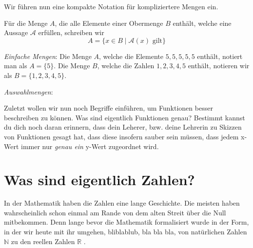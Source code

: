 Wir führen nun eine kompakte Notation für kompliziertere Mengen ein. 
\begin{definition}[Auswahl]
    Für die Menge \(A\), die alle Elemente einer Obermenge \(B\) enthält, welche eine Aussage \(\mathscr A\) erfüllen, schreiben wir 
    \begin{equation*}
        A = \{x \in B \mid \mathscr A(x) \text{ gilt}\}
    \end{equation*}
\end{definition}


\begin{definition}[Komplement]
    
\end{definition}

\begin{example}
    \begin{thmenum}
        \item \textit{Einfache Mengen}: Die Menge \(A\), welche die Elemente \(5, 5, 5, 5, 5\) enthält, notiert man als \(A = \{5\}\). Die Menge \(B\), welche die Zahlen \(1, 2, 3, 4, 5\) enthält, notieren wir als \(B = \{1, 2, 3, 4, 5\}\). 

        \item \textit{Auswahlmengen}:
    \end{thmenum}
\end{example}

\begin{definition}
    
\end{definition}

Zuletzt wollen wir nun noch Begriffe einführen, um Funktionen besser beschreiben zu können. Was sind eigentlich Funktionen genau? Bestimmt kannst du dich noch daran erinnern, dass dein Leherer, bzw. deine Lehrerin zu Skizzen von Funktionen gesagt hat, dass diese insofern sauber sein müssen, dass jedem x-Wert immer nur \textit{genau ein} y-Wert zugeordnet wird. 

\section{Was sind eigentlich Zahlen?} \label{sec:was-sind-eig-zahlen}
In der Mathematik haben die Zahlen eine lange Geschichte. Die meisten haben wahrscheinlich schon einmal am Rande von dem alten Streit über die Null mitbekommen. Denn lange bevor die Mathematik formalisiert wurde in der Form, in der wir heute mit ihr umgehen, bliblablub, bla bla bla, von natürlichen Zahlen \(\mathbb N\)  zu den reellen Zahlen \(\mathbb R\) .

